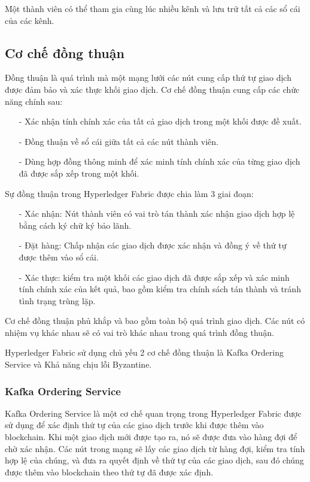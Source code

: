 Một thành viên có thể tham gia cùng lúc nhiều kênh và lưu trữ tất cả các sổ cái của các kênh.

\subsection{Cơ chế đồng thuận}

Đồng thuận là quá trình mà một mạng lưới các nút cung cấp thứ tự giao dịch được đảm 
bảo và xác thực khối giao dịch. Cơ chế đồng thuận cung cấp các chức năng chính sau: 

\begin{itemize}
    \item[-] Xác nhận tính chính xác của tất cả giao dịch trong một khối được đề xuất.
    \item[-] Đồng thuận về sổ cái giữa tất cả các nút thành viên.
    \item[-] Dùng hợp đồng thông minh để xác minh tính chính xác của từng giao dịch đã được sắp xếp trong một khối.
\end{itemize} 

Sự đồng thuận trong Hyperledger Fabric được chia làm 3 giai đoạn:

\begin{itemize}
    \item[-] Xác nhận: Nút thành viên có vai trò tán thành xác nhận giao dịch hợp lệ bằng cách ký chữ ký bảo lãnh.
    \item[-] Đặt hàng: Chấp nhận các giao dịch được xác nhận và đồng ý về thứ tự được thêm vào sổ cái.
    \item[-] Xác thực: kiểm tra một khối các giao dịch đã được sắp xếp và xác minh tính chính xác của kết quả, 
    bao gồm kiểm tra chính sách tán thành và tránh tình trạng trùng lặp. \cite{consensus}
\end{itemize}

Cơ chế đồng thuận phủ khắp và bao gồm toàn bộ quá trình giao dịch. Các nút 
có nhiệm vụ khác nhau sẽ có vai trò khác nhau trong quá trình đồng thuận.

Hyperledger Fabric sử dụng chủ yếu 2 cơ chế đồng thuận là Kafka Ordering Service và Khả năng chịu lỗi
Byzantine.

\subsubsection{Kafka Ordering Service}
Kafka Ordering Service là một cơ chế quan trọng trong Hyperledger Fabric được sử dụng
để xác định thứ tự của các giao dịch trước khi được thêm vào blockchain. Khi một giao 
dịch mới được tạo ra, nó sẽ được đưa vào hàng đợi để chờ xác nhận. Các nút trong mạng 
sẽ lấy các giao dịch từ hàng đợi, kiểm tra tính hợp lệ của chúng, và đưa ra quyết 
định về thứ tự của các giao dịch, sau đó chúng được thêm vào blockchain theo thứ tự 
đã được xác định.

